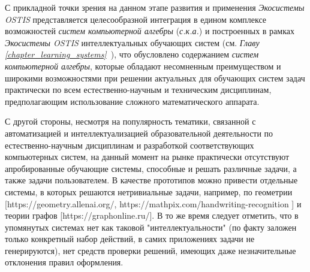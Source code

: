 С прикладной точки зрения на данном этапе развития и применения \textit{Экосистемы OSTIS} представляется целесообразной интеграция в едином комплексе возможностей \textit{систем компьютерной алгебры} (\textit{с.к.а.}) и построенных в рамках \textit{Экосистемы OSTIS} интеллектуальных обучающих систем (см. \textit{Главу \ref{chapter_learning_systems}~}), что обусловлено содержанием \textit{систем компьютерной алгебры}, которые обладают несомненным преимуществом и широкими возможностями при решении актуальных для обучающих систем задач практически по всем естественно-научным и техническим дисциплинам, предполагающим использование сложного математического аппарата.

С другой стороны, несмотря на популярность тематики, связанной с автоматизацией и интеллектуализацией образовательной деятельности по естественно-научным дисциплинам и разработкой соответствующих компьютерных систем, на данный момент на рынке практически отсутствуют апробированные  обучающие системы, способные  и решать различные задачи, а также  задачи пользователем. В качестве прототипов можно привести отдельные системы, в которых решаются нетривиальные задачи, например, по геометрии [https://geometry.allenai.org/, https://mathpix.com/handwriting-recognition ] и теории графов [https://graphonline.ru/]. В то же время следует отметить, что в упомянутых системах нет как таковой "интеллектуальности"{} (по факту заложен только конкретный набор действий, в самих приложениях задачи не генерируются), нет средств проверки решений, имеющих даже незначительные отклонения правил оформления.

